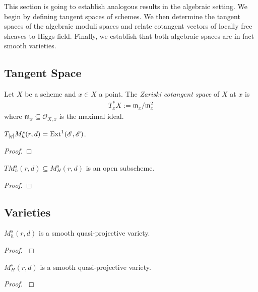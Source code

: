 \documentclass[12pt]{ociamthesis}  %
\begin{document}
This section is going to establish analogous results in the algebraic
setting. We begin by defining tangent spaces of schemes. We then
determine the tangent spaces of the algebraic moduli spaces and
relate cotangent vectors of locally free sheaves to Higgs field. Finally,
we establish that both algebraic spaces are in fact smooth varieties.

\subsection{Tangent Space}

\begin{definition}
  Let $X$ be a scheme and $x\in X$ a point. The \emph{Zariski cotangent
    space} of $X$ at $x$ is
  \begin{align*}
    T_x^* X := \mathfrak m_x /\mathfrak m_x^2
  \end{align*}
  where $\mathfrak m_x\subseteq\mathscr O_{X,x}$ is the maximal ideal.
\end{definition}

\begin{theorem}
  $T_{[q]} M^s_h(r,d) = \operatorname{Ext}^1(\mathscr E,\mathscr E)$.
  \begin{proof}
    \missingproof
  \end{proof}
\end{theorem}



\begin{corollary}\label{thm:cotangent_is_open}
  $TM^s_h(r,d)\subseteq M^s_H(r,d)$ is an open subscheme.
  \begin{proof}
    \missingproof
  \end{proof}
\end{corollary}

\subsection{Varieties}

\begin{theorem}
  $M^s_h(r,d)$ is a smooth quasi-projective variety.
  \begin{proof}
    \cite[Proposition 8.65]{hoskins2016}
    \missingproof
  \end{proof}
\end{theorem}

\begin{theorem}
  $M^s_H(r,d)$ is a smooth quasi-projective variety.
  \begin{proof}
    \cite[Proposition 7.4]{nitsure1991}
    \missingproof
  \end{proof}
\end{theorem}
\end{document}
